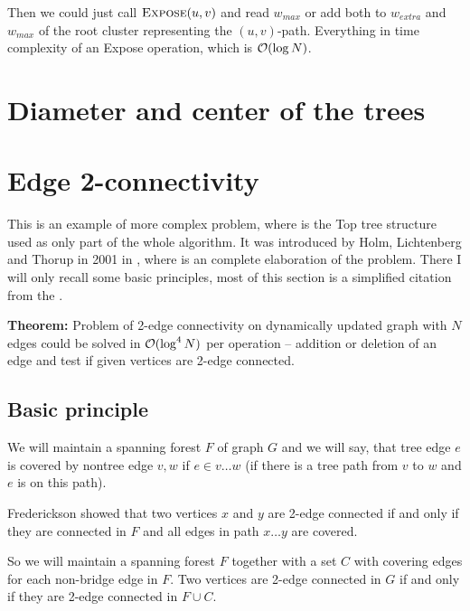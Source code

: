 Then we could just call $\hbox{\sc Expose}(u,v)$ and read $w_{max}$ or add both to
$w_{extra}$ and $w_{max}$ of the root cluster representing the $(u,v)$-path.
Everything in time complexity of an {\sc Expose} operation, which is ${\cal O}(\log
N)$.


\section{Diameter and center of the trees}


\section{Edge 2-connectivity}
\label{sec:edge_2_connectivity}

This is an example of more complex problem, where is the Top tree structure used
as only part of the whole algorithm. It was introduced by Holm, Lichtenberg and
Thorup in 2001 in \cite{PolylogarithmicAlgorithmsForConnectivity}, where is an
complete elaboration of the problem. There I will only recall some basic
principles, most of this section is a simplified citation from the
\cite{PolylogarithmicAlgorithmsForConnectivity}.

\noindent
{\bf Theorem:} Problem of 2-edge connectivity on dynamically updated graph with
$N$ edges could be solved in ${\cal O}(\log^4 N)$ per operation -- addition or
deletion of an edge and test if given vertices are 2-edge connected.

\subsection{Basic principle}

We will maintain a spanning forest $F$ of graph $G$ and we will say, that tree
edge $e$ is {\I covered} by nontree edge $v,w$ if $e \in v\dots w$ (if there is
a tree path from $v$ to $w$ and $e$ is on this path).

Frederickson showed that two vertices $x$ and $y$ are 2-edge connected if and
only if they are connected in $F$ and all edges in path $x\dots y$ are covered.

So we will maintain a spanning forest $F$ together with a set $C$ with covering
edges for each non-bridge edge in $F$. Two vertices are 2-edge connected in $G$
if and only if they are 2-edge connected in $F\cup C$.

